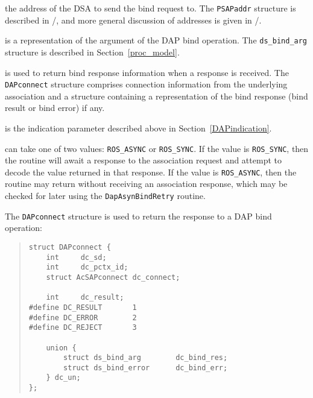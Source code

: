 \begin{describe}
\item [\verb"calledaddr":]
the address of the DSA to send the bind request to.
The \verb"PSAPaddr" structure is described in
\voltwo/, and more general discussion of addresses is given in
\volone/.

\item [\verb"bindarg":]
is a representation of the argument of the DAP bind operation.
The \verb"ds_bind_arg" structure is described in Section~\ref{proc_model}.

\item [\verb"dc":]
is used to return bind response information when a response is received.
The \verb"DAPconnect" structure comprises connection information from
the underlying association and a structure containing a representation
of the bind response (bind result or bind error) if any.

\item [\verb"di":]
is the indication parameter described above in Section~\ref{DAPindication}.

\item [\verb"async":]
can take one of two values: \verb"ROS_ASYNC" or \verb"ROS_SYNC".
If the value is \verb"ROS_SYNC", then the routine will await a response
to the association request and attempt to decode the value returned in
that response.
If the value is \verb"ROS_ASYNC", then the routine may return without
receiving an association response, which may be checked for later
using the \verb"DapAsynBindRetry" routine.
\end{describe}

The \verb"DAPconnect" structure is used to return the response to a DAP
bind operation:

\begin{quote}\small\begin{verbatim}
struct DAPconnect {
    int     dc_sd;
    int     dc_pctx_id;
    struct AcSAPconnect dc_connect;

    int     dc_result;
#define DC_RESULT       1
#define DC_ERROR        2
#define DC_REJECT       3

    union {
        struct ds_bind_arg        dc_bind_res;
        struct ds_bind_error      dc_bind_err;
    } dc_un;
};
\end{verbatim}\end{quote}

